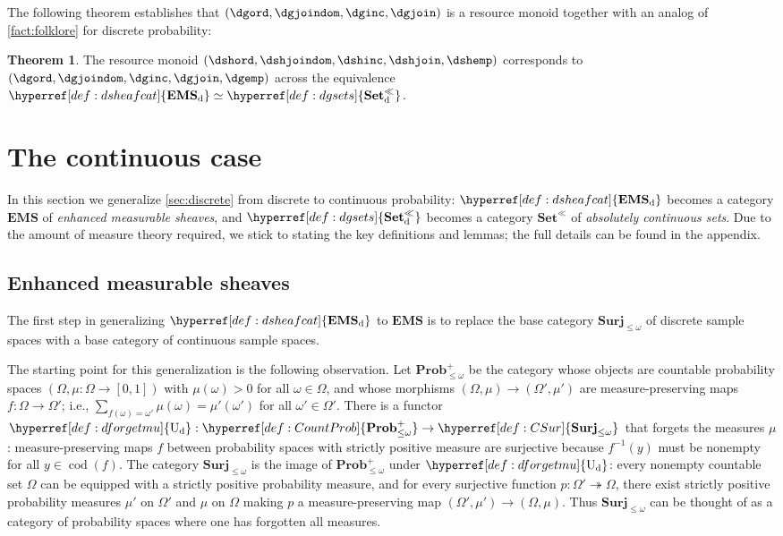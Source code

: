 \documentclass[
  sigconf,
  screen, ]{acmart}
\makeatletter
\theoremstyle{definition}
\newtheorem{theorem}{Theorem}[section]
\newcommand{\cod}{\operatorname{cod}}
\newcommand{\labelword}[2]{\phantomsection
  #1\def\@currentlabel{\unexpanded{#1}}\label{#2}}
\newcommand\appref[1]{the appendix}
\newcommand\appref[1]{\cref{#1}}
\newcommand\nref[2]{\hyperref[#1]{#2}} \newcommand\checkhigh{{\huge{\color{red}\textbf{TODO: check}}}}
\newcommand\dforgetmu{{\nref{def:dforgetmu}{\mathrm{U}_{\rm d}}}}
\newcommand\texagoodname{absolutely continuous set}
\newcommand\agoodname{\texagoodname}
\newcommand\agoodnamecat{\mathbf{Set}^\ll}
\newcommand\sheafcatadj{enhanced measurable}
\newcommand\Sheafcatadj{Enhanced measurable}
\newcommand\texgoodsheaves{\sheafcatadj{} sheaves}
\newcommand\goodsheaves{\texgoodsheaves}
\newcommand\Goodsheavesnolink{\Sheafcatadj{} sheaves}
\newcommand\goodsheafcat{\mathbf{EMS}}
\newcommand\CountProb{{\nref{def:CountProb}{\mathbf{Prob}_{\le\omega}^+}}}
\newcommand\CSur{{\nref{def:CSur}{\mathbf{Surj}_{\le\omega}}}}
\newcommand\discsubscript{_{\rm d}}
\newcommand\dgsets{{\nref{def:dgsets}{\agoodnamecat\discsubscript}}}
\newcommand\dsheafcat{{\nref{def:dsheafcat}{\goodsheafcat\discsubscript}}}
\newcommand\sheafcat{{\nref{def:sheafcat}{\goodsheafcat}}}
\newcommand\cgsets{{\nref{def:cgsets}{\agoodnamecat}}}
\makeatother
\begin{document}
The following theorem establishes that 
$(\dgord,\dgjoindom,\dginc,\dgjoin)$ is a resource monoid
together with an analog of \cref{fact:folklore} for discrete probability:

\begin{theorem} \label{thm:discrete-krm}
  The resource monoid $(\dshord,\dshjoindom,\dshinc,\dshjoin,\dshemp)$
  corresponds to $(\dgord,\dgjoindom,\dginc,\dgjoin,\dgemp)$
  across the equivalence $\dsheafcat\simeq\dgsets$.
\end{theorem}


\section{The continuous case} \label{sec:cont}

In this section we generalize \cref{sec:discrete}
from discrete to continuous probability:
$\dsheafcat$ becomes
a category $\sheafcat$ of \emph{\goodsheaves{}},
and $\dgsets$ becomes a category $\cgsets$
of \emph{\agoodname{s}}.
Due to the amount of measure theory
required, we stick to stating the key definitions and lemmas;
the full details can be found in \appref{app:sec:goodsheaves,app:sec:agoodnames}.

\subsection{\Goodsheavesnolink{}}

The first step in generalizing $\dsheafcat$
to $\sheafcat$ is to replace the base category $\CSur$
of discrete sample spaces with a base category of continuous
sample spaces.

The starting point for this generalization is the following observation.
  \labelword{Let}{def:CountProb} $\CountProb$ be the category
  whose objects are countable probability spaces
  $(\Omega,\mu : \Omega\to[0,1])$
  with $\mu(\omega) > 0$ for all $\omega\in\Omega$,
  and whose morphisms
  $(\Omega, \mu)\to(\Omega',\mu')$
  are measure-preserving maps $f : \Omega\to\Omega'$;
  i.e., $\sum_{f(\omega) = \omega'}\mu(\omega) = \mu'(\omega')$
  for all $\omega'\in\Omega'$.
  \labelword{There}{def:dforgetmu} is a 
  functor $\dforgetmu : \CountProb\to\CSur$
  that forgets the measures $\mu$:
  measure-preserving maps $f$
  between probability spaces with strictly positive measure
  are surjective because
  $f^{-1}(y)$ must be nonempty for all $y\in\cod(f)$.
  The category $\CSur$ is the image of $\CountProb$ under
  $\dforgetmu$:
  every nonempty countable set $\Omega$ can be equipped with a strictly positive
  probability measure,
  and for every surjective function $p : \Omega'\twoheadrightarrow\Omega$,
  there exist strictly positive probability measures $\mu'$ on $\Omega'$
  and $\mu$ on $\Omega$ making $p$ a measure-preserving map $(\Omega',\mu')\to(\Omega,\mu)$.
Thus $\CSur$ can be thought of as a category of probability spaces
where one has forgotten all measures.
\end{document}
